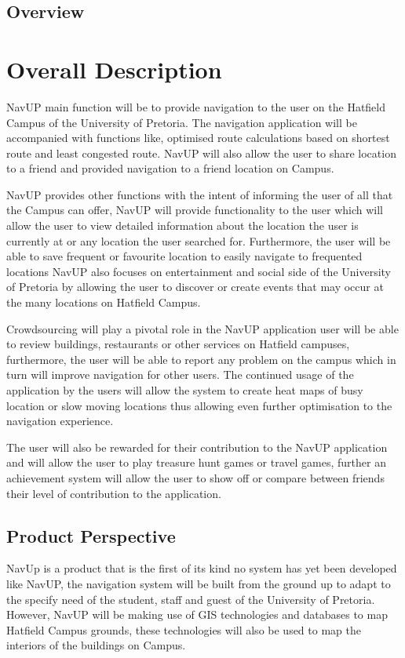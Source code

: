 \documentclass[12pt,a4paper]{article}
\begin{document}
	\subsection{Overview}
\section{Overall Description}
NavUP main function will be to provide navigation to the user on the Hatfield Campus of the University of Pretoria. The navigation application will be accompanied with functions like, optimised route calculations based on shortest route and least congested route. NavUP will also allow the user to share location to a friend and provided navigation to a friend location on Campus.\newline

NavUP provides other functions with the intent of informing the user of all that the Campus can offer, NavUP will provide functionality to the user which will allow the user to view detailed information about the location the user is currently at or any location the user searched for. Furthermore, the user will be able to save frequent or favourite location to easily navigate to frequented locations
NavUP also focuses on entertainment and social side of the University of Pretoria by allowing the user to discover or create events that may occur at the many locations on Hatfield Campus.\newline

Crowdsourcing will play a pivotal role in the NavUP application user will be able to review buildings, restaurants or other services on Hatfield campuses, furthermore, the user will be able to report any problem on the campus which in turn will improve navigation for other users. The continued usage of the application by the users will allow the system to create heat maps of busy location or slow moving locations thus allowing even further optimisation to the navigation experience.\newline

The user will also be rewarded for their contribution to the NavUP application and will allow the user to play treasure hunt games or travel games, further an achievement system will allow the user to show off or compare between friends their level of contribution to the application.\newline
	\subsection{Product Perspective}
		NavUp is a product that is the first of its kind no system has yet been developed like NavUP, the navigation system will be built from the ground up to adapt to the specify need of the student, staff and guest of the University of Pretoria. However, NavUP will be making use of GIS technologies and databases to map Hatfield Campus grounds, these technologies will also be used to map the interiors of the buildings on Campus.\newline
\end{document}
